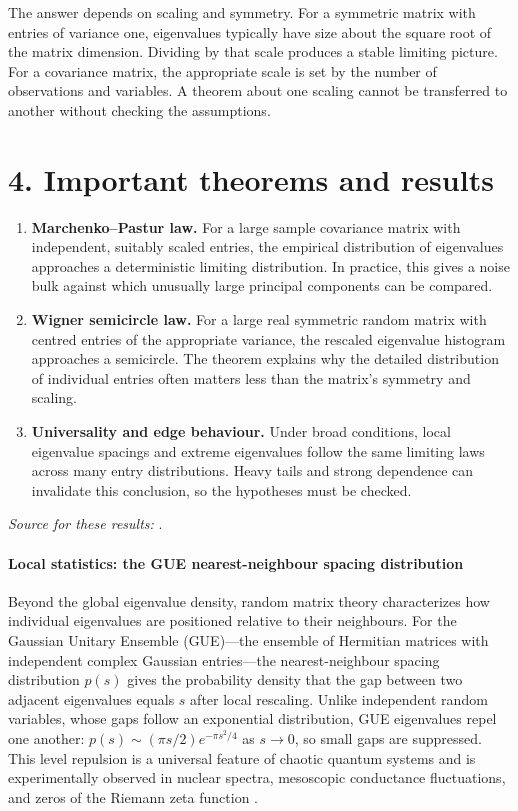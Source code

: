 The answer depends on scaling and symmetry.  For a symmetric matrix with
entries of variance one, eigenvalues typically have size about the square
root of the matrix dimension.  Dividing by that scale produces a stable
limiting picture.  For a covariance matrix, the appropriate scale is set by
the number of observations and variables.  A theorem about one scaling
cannot be transferred to another without checking the assumptions.

\section*{4. Important theorems and results}
\begin{enumerate}[leftmargin=*,itemsep=0.35em]
\item \textbf{Marchenko--Pastur law.} For a large sample covariance matrix with
independent, suitably scaled entries, the empirical distribution of
eigenvalues approaches a deterministic limiting distribution.  In practice,
this gives a noise bulk against which unusually large principal components
can be compared.

\item \textbf{Wigner semicircle law.} For a large real symmetric random matrix with
centred entries of the appropriate variance, the rescaled eigenvalue
histogram approaches a semicircle.  The theorem explains why the detailed
distribution of individual entries often matters less than the matrix's
symmetry and scaling.

\item \textbf{Universality and edge behaviour.} Under broad conditions, local
eigenvalue spacings and extreme eigenvalues follow the same limiting laws
across many entry distributions.  Heavy tails and strong dependence can
invalidate this conclusion, so the hypotheses must be checked.

\end{enumerate}
\noindent\emph{Source for these results:} \cite{random_matrix_theory_ref1}.

\paragraph{Local statistics: the GUE nearest-neighbour spacing distribution}
Beyond the global eigenvalue density, random matrix theory characterizes
how individual eigenvalues are positioned relative to their neighbours. For
the Gaussian Unitary Ensemble (GUE)---the ensemble of Hermitian matrices
with independent complex Gaussian entries---the nearest-neighbour spacing
distribution $p(s)$ gives the probability density that the gap between two
adjacent eigenvalues equals $s$ after local rescaling. Unlike independent
random variables, whose gaps follow an exponential distribution, GUE
eigenvalues repel one another: $p(s)\sim(\pi s/2)e^{-\pi s^2/4}$ as
$s\to0$, so small gaps are suppressed. This level repulsion is a universal
feature of chaotic quantum systems and is experimentally observed in nuclear
spectra, mesoscopic conductance fluctuations, and zeros of the Riemann zeta
function \cite{random_matrix_theory_ref1}.

